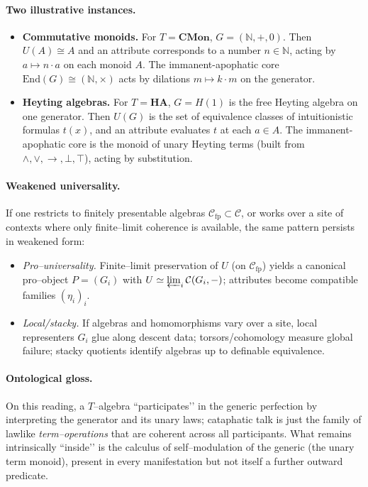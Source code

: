 \documentclass[11pt]{article}
\theoremstyle{upright}
\begin{document}
\paragraph{Two illustrative instances.}
\begin{itemize}[leftmargin=2em]
\item \textbf{Commutative monoids.} For \(T=\mathbf{CMon}\), \(G=(\mathbb N,+,0)\). Then \(U(A)\cong A\) and an attribute corresponds to a number \(n\in\mathbb N\), acting by \(a\mapsto n\cdot a\) on each monoid \(A\). The immanent-apophatic core \(\mathrm{End}(G)\cong(\mathbb N,\times)\) acts by dilations \(m\mapsto k\cdot m\) on the generator.
\item \textbf{Heyting algebras.} For \(T=\mathbf{HA}\), \(G=H(1)\) is the free Heyting algebra on one generator. Then \(U(G)\) is the set of equivalence classes of intuitionistic formulas \(t(x)\), and an attribute evaluates \(t\) at each \(a\in A\). The immanent-apophatic core is the monoid of unary Heyting terms (built from \(\wedge,\vee,\to,\bot,\top\)), acting by substitution.
\end{itemize}

\paragraph{Weakened universality.}
If one restricts to finitely presentable algebras \(\mathcal C_{\mathrm{fp}}\subset\mathcal C\), or works over a site of contexts where only finite–limit coherence is available, the same pattern persists in weakened form:
\begin{itemize}[leftmargin=2em]
\item \emph{Pro–universality.} Finite–limit preservation of \(U\) (on \(\mathcal C_{\mathrm{fp}}\)) yields a canonical pro–object \(P=(G_i)\) with \(U\simeq \varprojlim_i \mathcal C(G_i,-)\); attributes become compatible families \((\eta_i)_i\).
\item \emph{Local/stacky.} If algebras and homomorphisms vary over a site, local representers \(G_i\) glue along descent data; torsors/cohomology \citep{Giraud1971} measure global failure; stacky quotients identify algebras up to definable equivalence.
\end{itemize}

\paragraph{Ontological gloss.}
On this reading, a \(T\)–algebra ``participates’’ in the generic perfection by interpreting the generator and its unary laws; cataphatic talk is just the family of lawlike \emph{term–operations} that are coherent across all participants. What remains intrinsically ``inside’’ is the calculus of self–modulation of the generic (the unary term monoid), present in every manifestation but not itself a further outward predicate.
\end{document}
